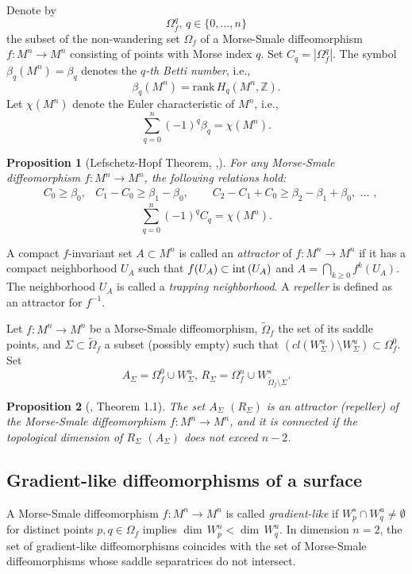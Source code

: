 \documentclass{amsart}
\newtheorem{propos}{Proposition}
\renewcommand{\geq}{\geqslant}
\numberwithin{equation}{section}
\begin{document}
	Denote by $$\Omega_f^q,\,q\in\{0,\dots,n\}$$ the subset of the non-wandering set $\Omega_f$ of a Morse-Smale diffeomorphism $f:M^n\to M^n$ consisting of points with Morse index $q$. Set $C_q=|\Omega_f^q|$. The symbol $\beta_q(M^n) = \beta_q$ denotes the {\it $q$-th Betti number}, i.e., 
	$$\beta_q(M^n) = \mathrm{rank}\, H_q(M^n, \mathbb Z).$$ Let $\chi(M^n)$ denote the Euler characteristic of $M^n$, i.e., 
	\[\sum\limits_{q=0}^n(-1)^q \beta_q = \chi(M^n).\]
	\begin{propos}[Lefschetz-Hopf Theorem, \cite{ShubSull_Homology75},\cite{Smale_Morse60}]\label{lefschetz} For any Morse-Smale diffeomorphism $f:M^n\to M^n$, the following relations hold:
		\begin{align}\label{beti}
			& C_0 \geq \beta_0, & C_1-C_0 \geq \beta_1 - \beta_0,\,\,\,\,\,\,\,\, & C_2 - C_1 + C_0 \geq \beta_2 -\beta_1 + \beta_0,\,\,\dots\,\,,
		\end{align}
		\begin{equation}\label{sum}
			\sum\limits_{q=0}^n(-1)^q C_q= \chi(M^n).
		\end{equation}
	\end{propos}
	
	A compact $f$-invariant set $A\subset M^n$ is called an {\it attractor} of $f:M^n\to M^n$ if it has a compact neighborhood $U_{A}$ such that $f(U_{A})\subset {\rm int}\,(U_{A})$ and $A = \underset{k\geqslant 0}{\bigcap} f^{k}(U_{A}).$ The neighborhood $U_{A}$ is called a {\it trapping neighborhood}. A {\it repeller} is defined as an attractor for $f^{-1}$.
	
	Let $f:M^n\to M^n$ be a Morse-Smale diffeomorphism, $\tilde \Omega_f$ the set of its saddle points, and $\Sigma\subset\tilde \Omega_f$ a subset (possibly empty) such that $\left(cl(W^u_\Sigma)\setminus W^u_\Sigma\right)\subset\Omega^0_f$. Set $$A_\Sigma=\Omega^0_f\cup W^u_\Sigma,\,R_\Sigma=\Omega^n_f\cup W^s_{\tilde\Omega_f\setminus\Sigma}.$$ 
	
	\begin{propos}[\cite{GrZhuMePo}, Theorem 1.1]\label{<n-2} The set $A_\Sigma$ $(R_\Sigma)$ is an attractor (repeller) of the Morse-Smale diffeomorphism $f:M^n\to M^n$, and it is connected if the topological dimension of $R_\Sigma$ $(A_\Sigma)$ does not exceed $n-2$.
	\end{propos}
	
	\subsection{Gradient-like diffeomorphisms of a surface} A Morse-Smale diffeomorphism $f:M^n\to M^n$ is called {\it gradient-like} if $W^s_{p} \cap W^u_{q}\neq \emptyset $ for distinct points $p, q \in \Omega_f$ implies $\dim\, W^u_{p}< \dim\, W^u_{q}.$ In dimension $n=2$, the set of gradient-like diffeomorphisms coincides with the set of Morse-Smale diffeomorphisms whose saddle separatrices do not intersect.
	
\end{document}
